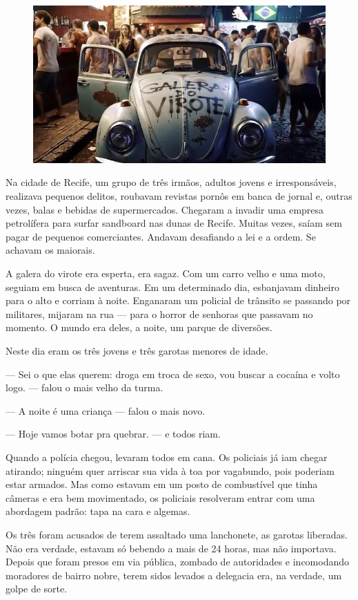 \documentclass[a4paper,14pt]{book}
\begin{document}
\begin{figure}[h!]
    \includegraphics[width=1\linewidth]{img/galera_do_virote.jpg}
\end{figure}

Na cidade de Recife, um grupo de três irmãos, adultos jovens e irresponsáveis, realizava pequenos delitos, roubavam revistas pornôs em banca de jornal e, outras vezes, balas e bebidas de supermercados. Chegaram a invadir uma empresa petrolífera para surfar sandboard nas dunas de Recife. Muitas vezes, saíam sem pagar de pequenos comerciantes. Andavam desafiando a lei e a ordem. Se achavam os maiorais.

A galera do virote era esperta, era sagaz. Com um carro velho e uma moto, seguiam em busca de aventuras. Em um determinado dia, esbanjavam dinheiro para o alto e corriam à noite. Enganaram um policial de trânsito se passando por militares, mijaram na rua — para o horror de senhoras que passavam no momento. O mundo era deles, a noite, um parque de diversões.

Neste dia eram os três jovens e três garotas menores de idade.

— Sei o que elas querem: droga em troca de sexo, vou buscar a cocaína e volto logo. — falou o mais velho da turma.

— A noite é uma criança — falou o mais novo.

— Hoje vamos botar pra quebrar. — e todos riam.

Quando a polícia chegou, levaram todos em cana. Os policiais já iam chegar atirando; ninguém quer arriscar sua vida à toa por vagabundo, pois poderiam estar armados. Mas como estavam em um posto de combustível que tinha câmeras e era bem movimentado, os policiais resolveram entrar com uma abordagem padrão: tapa na cara e algemas.

Os três foram acusados de terem assaltado uma lanchonete, as garotas liberadas. Não era verdade, estavam só bebendo a mais de 24 horas, mas não importava. Depois que foram presos em via pública, zombado de autoridades e incomodando moradores de bairro nobre, terem sidos levados a delegacia era, na verdade, um golpe de sorte.
\end{document}
